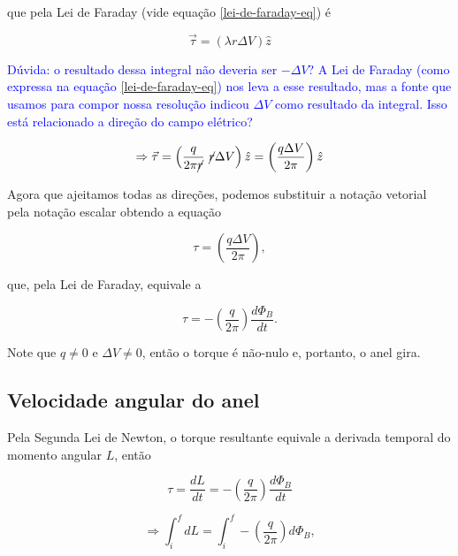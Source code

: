 \documentclass[
	article,
	11pt,
	oneside,
	a4paper,
	english,
	brazil,
	sumario=tradicional
	]{abntex2}
\begin{document}
\noindent que pela Lei de Faraday (vide equação \ref{lei-de-faraday-eq}) é

\begin{equation}
    \vec{\tau} = \left(\lambda r \Delta V \right) \hat{z}
\end{equation}

\noindent\textcolor{blue}{Dúvida: o resultado dessa integral não deveria ser $-\Delta V$? A Lei de Faraday (como expressa na equação \ref{lei-de-faraday-eq}) nos leva a esse resultado, mas a fonte que usamos para compor nossa resolução \cite{leclair_2008} indicou $\Delta V$ como resultado da integral. Isso está relacionado a direção do campo elétrico?}

\begin{equation}
    \Rightarrow \vec{\tau} = \left(\frac{q}{2\pi \cancel{r}}~\cancel{r} \Delta V \right) \hat{z} = \left(\frac{q \Delta V}{2\pi}\right) \hat{z}
\end{equation}

Agora que ajeitamos todas as direções, podemos substituir a notação vetorial pela notação escalar obtendo a equação

\begin{equation}
    \tau =  \left(\frac{q \Delta V}{2\pi}\right),
\end{equation}

\noindent que, pela Lei de Faraday, equivale a

\begin{equation}
    \tau =  - \left(\frac{q}{2\pi}\right)\frac{d \Phi_B}{d t}.
\end{equation}

Note que $q \ne 0$ e $\Delta V \ne 0$, então o torque é não-nulo e, portanto, o anel gira.

\subsection{Velocidade angular do anel}
Pela Segunda Lei de Newton, o torque resultante equivale a derivada temporal do momento angular $L$, então

\begin{equation}
    \tau = \frac{dL}{dt} =  - \left(\frac{q}{2\pi}\right)\frac{d\Phi_B}{dt}
\end{equation}

\begin{equation} \label{integral-momento-angular-eq}
    \Rightarrow \int_i^f dL = \int_i^f - \left(\frac{q}{2\pi}\right) d\Phi_B,
\end{equation}
\end{document}
